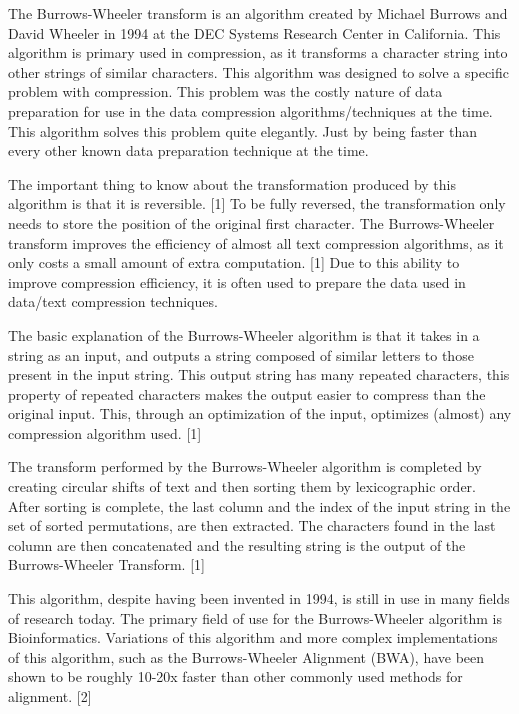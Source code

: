 \documentclass{article}
\begin{document}
   The Burrows-Wheeler transform is an algorithm created by Michael Burrows and David Wheeler in 1994 at the DEC Systems Research Center in California. This algorithm is primary used in compression, as it transforms a character string into other strings of similar characters. This algorithm was designed to solve a specific problem with compression. This problem was the costly nature of data preparation for use in the data compression algorithms/techniques at the time. This algorithm solves this problem quite elegantly. Just by being faster than every other known data preparation technique at the time.

   The important thing to know about the transformation produced by this algorithm is that it is reversible. [1] To be fully reversed, the transformation only needs to store the position of the original first character. The Burrows-Wheeler transform improves the efficiency of almost all text compression algorithms, as it only costs a small amount of extra computation. [1] Due to this ability to improve compression efficiency, it is often used to prepare the data used in data/text compression techniques. 
   
   The basic explanation of the Burrows-Wheeler algorithm is that it takes in a string as an input, and outputs a string composed of similar letters to those present in the input string. This output string has many repeated characters, this property of repeated characters makes the output easier to compress than the original input. This, through an optimization of the input, optimizes (almost) any compression algorithm used. [1]
   
   The transform performed by the Burrows-Wheeler algorithm is completed by creating circular shifts of text and then sorting them by lexicographic order. After sorting is complete, the last column and the index of the input string in the set of sorted permutations, are then extracted. The characters found in the last column are then concatenated and the resulting string is the output of the Burrows-Wheeler Transform. [1]
   
   This algorithm, despite having been invented in 1994, is still in use in many fields of research today. The primary field of use for the Burrows-Wheeler algorithm is Bioinformatics. Variations of this algorithm and more complex implementations of this algorithm, such as the Burrows-Wheeler Alignment (BWA), have been shown to be roughly 10-20x faster than other commonly used methods for alignment. [2]
   
\end{document}
